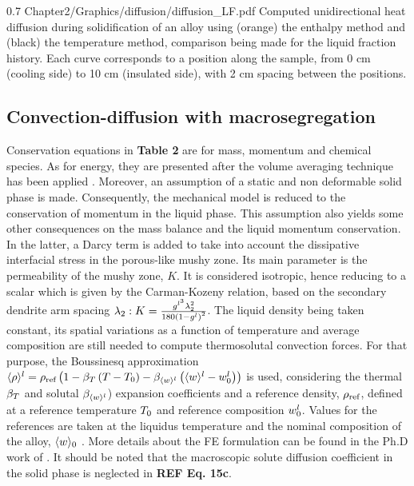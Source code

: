 %
\begin{figureth}
{0.7}
{Chapter2/Graphics/diffusion/diffusion_LF.pdf}
{Computed unidirectional heat diffusion during solidification of an  alloy 
using (orange) the enthalpy method and (black) the temperature method, comparison being made 
for the liquid fraction history. Each curve corresponds to a position along the sample, from 0 cm (cooling 
side) to 10 cm (insulated side), with 2 cm spacing between the positions.}
\label{fig:diffusion_LF}
\end{figureth}
%
\subsection{Convection-diffusion with macrosegregation}
Conservation equations in \textbf{Table 2} are for mass, momentum and chemical species. 
As for energy, they are presented after the volume averaging technique has been applied 
\citep{ni_volume-averaged_1991, dantzig_solidification_2009}. Moreover, an assumption 
of a static and non deformable solid phase is made. Consequently, the mechanical model is 
reduced to the conservation of momentum in the liquid phase. This assumption also yields 
some other consequences on the mass balance and the liquid momentum conservation. In the 
latter, a Darcy term is added to take into account the dissipative interfacial stress in 
the porous-like mushy zone. Its main parameter is the permeability of the mushy zone, $K$. 
It is considered isotropic, hence reducing to a scalar which is given by the Carman-Kozeny 
relation, based on the secondary dendrite arm spacing $\lambda_2: K= \frac{g^{l^3}  \lambda_2^{2}
 }{180\left( 1-g^l \right)^2}$. The liquid density being taken constant, its spatial variations 
as a function of temperature and average composition are still needed to compute thermosolutal 
convection forces. For that purpose, the Boussinesq approximation $\langle  \rho  \rangle^l = \rho_{\text{ref}} \left( 1-\beta_T 
\left( T-T_{0} \right)-\beta_{\langle w \rangle^l} \left( \langle w \rangle^l-w_{0}^l \right) \right)$ is used, considering the thermal $\beta_T$ and solutal $\beta_{\langle w \rangle^l}$) expansion coefficients 
and a reference density, $\rho_{\text{ref}}$, defined at a reference temperature $T_{0}$ and reference 
composition $w_{0}^l$. Values for the references are taken at the liquidus temperature and the nominal 
composition of the alloy, $\langle w \rangle_0$ \citep{carozzani_direct_2013}. More details about the FE formulation can be found in 
the Ph.D work of \citet{rivaux_simulation_2011, carozzani_developpement_2012}. It should be noted that the macroscopic 
solute diffusion coefficient in the solid phase is neglected in \textbf{REF Eq. 15c}. 

